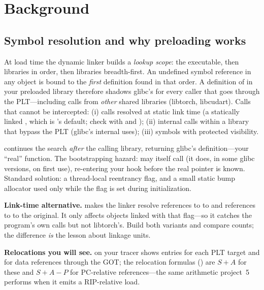 \section{Background}

\subsection{Symbol resolution and why preloading works}

At load time the dynamic linker builds a \emph{lookup scope}: the executable, then  libraries in order, then  libraries breadth-first. An undefined symbol reference in any object is bound to the \emph{first} definition found in that order. A definition of  in your preloaded library therefore shadows glibc's for every caller that goes through the PLT---including calls from \emph{other} shared libraries (libtorch, libcudart). Calls that cannot be intercepted: (i) calls resolved at static link time (a statically linked , which is 's default; check with  and ); (ii) internal calls within a library that bypass the PLT (glibc's internal  uses); (iii) symbols with protected visibility.

 continues the search \emph{after} the calling library, returning glibc's definition---your ``real'' function. The bootstrapping hazard:  may itself call  (it does, in some glibc versions, on first use), re-entering your hook before the real pointer is known. Standard solution: a thread-local reentrancy flag, and a small static bump allocator used only while the flag is set during initialization.

\textbf{Link-time alternative.}  makes the linker resolve references to  to  and references to  to the original. It only affects objects linked with that flag---so it catches the program's own calls but not libtorch's. Build both variants and compare counts; the difference \emph{is} the lesson about linkage units.

\textbf{Relocations you will see.}  on your tracer shows  entries for each PLT target and  for data references through the GOT; the relocation formulas () are $S+A$ for these and $S + A - P$ for PC-relative  references---the same arithmetic project~5 performs when it emits a RIP-relative load.

